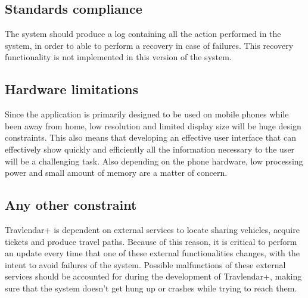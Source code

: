 \subsection{Standards compliance}
\label{subsect:Standards compliance}
	The system should produce a log containing all the action performed in the system, in order to able to perform a recovery in case of failures.
	\newline
	This recovery functionality is not implemented in this version of the system. 
\subsection{Hardware limitations}
\label{subsect:Hardware limitations}
	Since the application is primarily designed to be used on mobile phones while been away from home, low resolution and limited display size will be huge design constraints.
	\newline
	This also means that developing an effective user interface that can effectively show quickly and efficiently all the information necessary to the user will be a challenging task.
	\newline
	Also depending on the phone hardware, low processing power and small amount of memory are a matter of concern.

\subsection{Any other constraint}
\label{subsect:Any other constraint}
	Travlendar+ is dependent on external services to locate sharing vehicles, acquire tickets and produce travel paths. Because of this reason, it is critical to perform an update every time that one of these external functionalities changes, with the intent to avoid failures of the system.
	\newline
	Possible malfunctions of these external services should be accounted for during the development of Travlendar+, making sure that the system doesn't get hung up or crashes while trying to reach them.